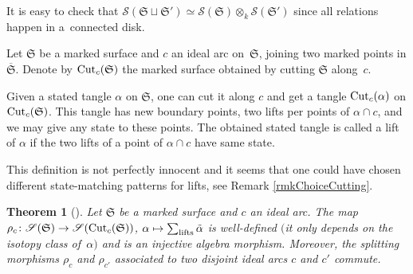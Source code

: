 \documentclass[pdftex]{sigma}%
\numberwithin{equation}{section}
\newtheorem{Theorem}{Theorem}[section]
\begin{document}
\begin{Remark}
It is easy to check that $\mathscr{S}(\mathfrak{S} \sqcup \mathfrak{S}') \simeq \mathscr{S}(\mathfrak{S}) \otimes_k \mathscr{S}(\mathfrak{S}')$ since all relations happen in a~connected disk.
\end{Remark}

\begin{Definition} 
Let $\mathfrak{S}$ be a marked surface and $c$ an ideal arc on~$\mathfrak{S}$, joining two marked points in $\overline{\mathfrak{S}}$. Denote by ${\rm Cut}_c(\mathfrak{S})$ the marked surface obtained by cutting $\mathfrak{S}$ along~$c$.

Given a stated tangle $\alpha$ on $\mathfrak{S}$, one can cut it along $c$ and get a tangle ${\rm Cut}_c(\alpha)$ on ${\rm Cut}_c(\mathfrak{S})$. This tangle has new boundary points, two lifts per points of $\alpha \cap c$, and we may give any state to these points. The obtained stated tangle is called a lift of $\alpha$ if the two lifts of a point of $\alpha \cap c$ have same state.
\end{Definition}

This definition is not perfectly innocent and it seems that one could have chosen different state-matching patterns for lifts, see Remark \ref{rmkChoiceCutting}.

\begin{Theorem}[{\cite[Theorem~3.1]{TTQLe}}]\label{splitmorph} Let $\mathfrak{S}$ be a marked surface and $c$ an ideal arc. The map $\rho_c\colon \mathscr{S}(\mathfrak{S}) \to \mathscr{S}({\rm Cut}_c(\mathfrak{S}))$, $\alpha \mapsto \sum_{\rm lifts} \tilde{\alpha}$ is well-defined $($it only depends on the isotopy class of~$\alpha)$ and is an injective algebra morphism. Moreover, the splitting morphisms $\rho_c$ and $\rho_{c'}$ associated to two disjoint ideal arcs $c$ and $c'$ commute.
\end{Theorem}
\end{document}

